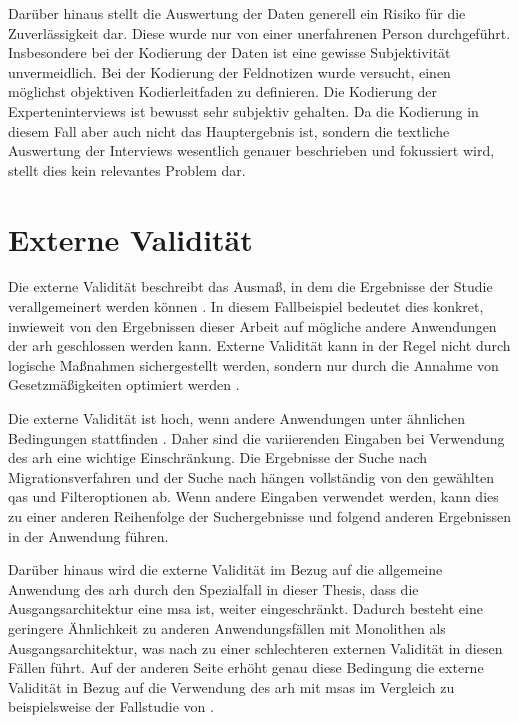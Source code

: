 Darüber hinaus stellt die Auswertung der Daten generell ein Risiko für die Zuverlässigkeit dar. 
Diese wurde nur von einer unerfahrenen Person durchgeführt. 
Insbesondere bei der Kodierung der Daten ist eine gewisse Subjektivität unvermeidlich.
Bei der Kodierung der Feldnotizen wurde versucht, einen möglichst objektiven Kodierleitfaden zu definieren.
Die Kodierung der Experteninterviews ist bewusst sehr subjektiv gehalten.
Da die Kodierung in diesem Fall aber auch nicht das Hauptergebnis ist, sondern die textliche Auswertung der Interviews wesentlich genauer beschrieben und fokussiert wird, stellt dies kein relevantes Problem dar.

\section{Externe Validität}

Die externe Validität beschreibt das Ausmaß, in dem die Ergebnisse der Studie verallgemeinert werden können \cite{Runeson2009}. 
In diesem Fallbeispiel bedeutet dies konkret, inwieweit von den Ergebnissen dieser Arbeit auf mögliche andere Anwendungen der \gls{arh} geschlossen werden kann.
Externe Validität kann in der Regel nicht durch logische Maßnahmen sichergestellt werden, sondern nur durch die Annahme von Gesetzmäßigkeiten optimiert werden \cite{campbell2015experimental}.

Die externe Validität ist hoch, wenn andere Anwendungen unter ähnlichen Bedingungen stattfinden \cite{campbell2015experimental}.
Daher sind die variierenden Eingaben bei Verwendung des \gls{arh} eine wichtige Einschränkung.
Die Ergebnisse der Suche nach Migrationsverfahren und der Suche nach \bpp hängen vollständig von den gewählten \glspl{qa} und Filteroptionen ab.
Wenn andere Eingaben verwendet werden, kann dies zu einer anderen Reihenfolge der Suchergebnisse und folgend anderen Ergebnissen in der Anwendung führen.

Darüber hinaus wird die externe Validität im Bezug auf die allgemeine Anwendung des \gls{arh} durch den Spezialfall in dieser Thesis, dass die Ausgangsarchitektur eine \gls{msa} ist, weiter eingeschränkt.
Dadurch besteht eine geringere Ähnlichkeit zu anderen Anwendungsfällen mit Monolithen als Ausgangsarchitektur, was nach  zu einer schlechteren externen Validität in diesen Fällen führt.
Auf der anderen Seite erhöht genau diese Bedingung die externe Validität in Bezug auf die Verwendung des \gls{arh} mit \glspl{msa} im Vergleich zu beispielsweise der Fallstudie von .

